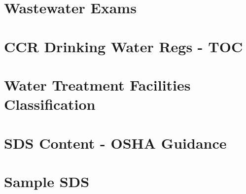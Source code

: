 \documentclass[11pt,fleqn]{book} %
\begin{document}
\chapter{Wastewater Exams}\label{appendix:Wastewater Exams}


\chapter{CCR Drinking Water Regs - TOC}\label{appendix:CCR Drinking Water Regs - TOC}
\newpage


\chapter{Water Treatment Facilities Classification}\label{appendix:Water Treatment Facilities Classification}


\chapter{SDS Content - OSHA Guidance}\label{appendix:SDS Content - OSHA Guidance}


\chapter{Sample SDS}\label{appendix:Sample SDS}

\end{document}
